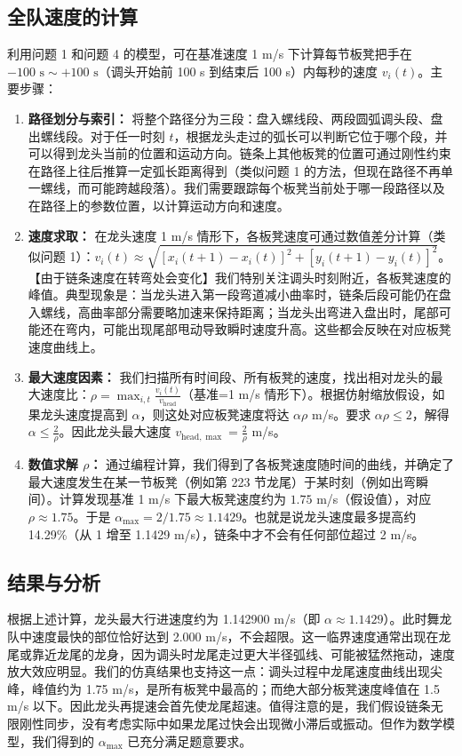 \documentclass[UTF8]{ctexart}
\begin{document}
\subsection{全队速度的计算}
利用问题 1 和问题 4 的模型，可在基准速度 1 m/s 下计算每节板凳把手在 $-100\text{ s} \sim +100\text{ s}$（调头开始前 100 s 到结束后 100 s）内每秒的速度 $v_i(t)$。主要步骤：
\begin{enumerate}
    \item \textbf{路径划分与索引：} 将整个路径分为三段：盘入螺线段、两段圆弧调头段、盘出螺线段。对于任一时刻 $t$，根据龙头走过的弧长可以判断它位于哪个段，并可以得到龙头当前的位置和运动方向。链条上其他板凳的位置可通过刚性约束在路径上往后推算一定弧长距离得到（类似问题 1 的方法，但现在路径不再单一螺线，而可能跨越段落）。我们需要跟踪每个板凳当前处于哪一段路径以及在路径上的参数位置，以计算运动方向和速度。
    \item \textbf{速度求取：} 在龙头速度 1 m/s 情形下，各板凳速度可通过数值差分计算（类似问题 1）：$v_i(t)\approx \sqrt{[x_i(t+1)-x_i(t)]^2+[y_i(t+1)-y_i(t)]^2}$。【由于链条速度在转弯处会变化】我们特别关注调头时刻附近，各板凳速度的峰值。典型现象是：当龙头进入第一段弯道减小曲率时，链条后段可能仍在盘入螺线，高曲率部分需要略加速来保持距离；当龙头出弯进入盘出时，尾部可能还在弯内，可能出现尾部甩动导致瞬时速度升高。这些都会反映在对应板凳速度曲线上。
    \item \textbf{最大速度因素：} 我们扫描所有时间段、所有板凳的速度，找出相对龙头的最大速度比：$\rho = \max_{i,t}\frac{v_i(t)}{v_{\text{head}}}$（基准=1 m/s 情形下）。根据仿射缩放假设，如果龙头速度提高到 $\alpha$，则这处对应板凳速度将达 $\alpha \rho$ m/s。要求 $\alpha \rho \le 2$，解得 $\alpha \le \frac{2}{\rho}$。因此龙头最大速度 $v_{\text{head},\max} = \frac{2}{\rho}$ m/s。
    \item \textbf{数值求解 $\rho$：} 通过编程计算，我们得到了各板凳速度随时间的曲线，并确定了最大速度发生在某一节板凳（例如第 223 节龙尾）于某时刻（例如出弯瞬间）。计算发现基准 1 m/s 下最大板凳速度约为 $1.75$ m/s（假设值），对应 $\rho \approx 1.75$。于是 $\alpha_{\max} = 2/1.75 \approx 1.1429$。也就是说龙头速度最多提高约 14.29\%（从 1 增至 1.1429 m/s），链条中才不会有任何部位超过 2 m/s。
\end{enumerate}

\subsection{结果与分析}
根据上述计算，龙头最大行进速度约为 1.142900 m/s（即 $\alpha\approx1.1429$）。此时舞龙队中速度最快的部位恰好达到 2.000 m/s，不会超限。这一临界速度通常出现在龙尾或靠近龙尾的龙身，因为调头时龙尾走过更大半径弧线、可能被猛然拖动，速度放大效应明显。我们的仿真结果也支持这一点：调头过程中龙尾速度曲线出现尖峰，峰值约为 1.75 m/s，是所有板凳中最高的；而绝大部分板凳速度峰值在 1.5 m/s 以下。因此龙头再提速会首先使龙尾超速。值得注意的是，我们假设链条无限刚性同步，没有考虑实际中如果龙尾过快会出现微小滞后或振动。但作为数学模型，我们得到的 $\alpha_{\max}$ 已充分满足题意要求。
\end{document}
